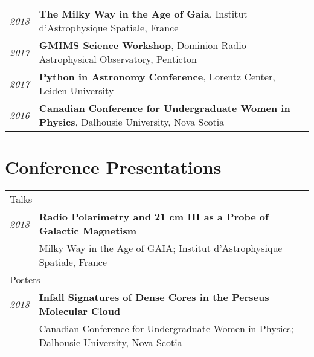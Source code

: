 \documentclass[10pt]{res} %
\begin{document}
\begin{resume}
\begin{table}[h!]
\begin{tabularx}{\textwidth}{lX}
\textit{2018} & \textbf{The Milky Way in the Age of Gaia}, Institut d'Astrophysique Spatiale, France \\
\textit{2017} & \textbf{GMIMS Science Workshop}, Dominion Radio Astrophysical Observatory, Penticton \\
\textit{2017} & \textbf{Python in Astronomy Conference}, Lorentz Center, Leiden University \\
\textit{2016} & \textbf{Canadian Conference for Undergraduate Women in Physics}, Dalhousie University, Nova Scotia
\end{tabularx}
\end{table}


\newpage
\section{\Large Conference Presentations}
\vspace{-5pt} %
\noindent\makebox[\linewidth]{\rule{\textwidth}{0.4pt}}
\vspace{-20pt} %

\begin{table}[h!]
\begin{tabularx}{\textwidth}{lX}
\multicolumn{2}{l}{ \rule{0pt}{3ex} \large \hspace{-12pt} Talks \dotfill \rule[-1.2ex]{0pt}{0pt}} \\
\textit{2018} & \textbf{Radio Polarimetry and 21 cm HI as a Probe of Galactic Magnetism} \\
 & Milky Way in the Age of GAIA; Institut d'Astrophysique Spatiale, France \\
\multicolumn{2}{l}{ \rule{0pt}{3ex} \large \hspace{-12pt} Posters \dotfill \rule[-1.2ex]{0pt}{0pt}}  \\
\textit{2018} & \textbf{Infall Signatures of Dense Cores in the Perseus Molecular Cloud} \\
 & Canadian Conference for Undergraduate Women in Physics; Dalhousie University, Nova Scotia
\end{tabularx}
\end{table}


\end{resume}
\end{document}
